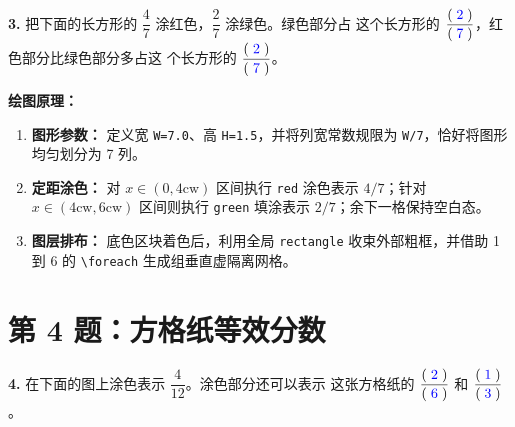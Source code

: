 \textbf{3.} 把下面的长方形的 $\dfrac{4}{7}$ 涂红色，$\dfrac{2}{7}$ 涂绿色。绿色部分占
这个长方形的 $\dfrac{(\;\textcolor{blue}{2}\;)}{(\;\textcolor{blue}{7}\;)}$，红色部分比绿色部分多占这
个长方形的 $\dfrac{(\;\textcolor{blue}{2}\;)}{(\;\textcolor{blue}{7}\;)}$。

\vspace{0.5cm}
\begin{center}
\end{center}

\vspace{0.5cm}
\textbf{绘图原理：}
\begin{enumerate}
    \item \textbf{图形参数：} 定义宽 \texttt{W=7.0}、高 \texttt{H=1.5}，并将列宽常数规限为 \texttt{W/7}，恰好将图形均匀划分为 7 列。
    \item \textbf{定距涂色：} 对 $x \in (0, 4\text{cw})$ 区间执行 \texttt{red} 涂色表示 $4/7$；针对 $x \in (4\text{cw}, 6\text{cw})$ 区间则执行 \texttt{green} 填涂表示 $2/7$；余下一格保持空白态。
    \item \textbf{图层排布：} 底色区块着色后，利用全局 \texttt{rectangle} 收束外部粗框，并借助 1 到 6 的 \texttt{\textbackslash foreach} 生成组垂直虚隔离网格。
\end{enumerate}

\vspace{1.5cm}

\section*{第 4 题：方格纸等效分数}

\textbf{4.} 在下面的图上涂色表示 $\dfrac{4}{12}$。涂色部分还可以表示
这张方格纸的 $\dfrac{(\;\textcolor{blue}{2}\;)}{(\;\textcolor{blue}{6}\;)}$ 和 $\dfrac{(\;\textcolor{blue}{1}\;)}{(\;\textcolor{blue}{3}\;)}$。

\vspace{0.5cm}
\begin{center}
\end{center}

